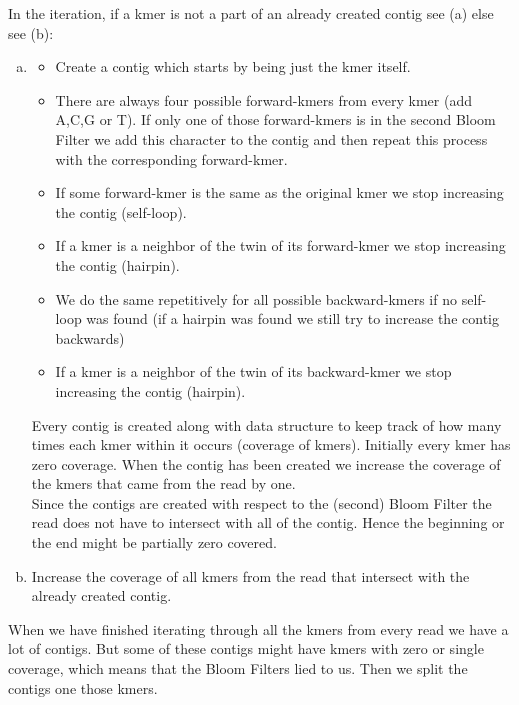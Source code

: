 \documentclass[a4paper]{report}
\begin{document}
In the iteration, if a kmer is not a part of an already created contig see (a) else see (b):

\begin{enumerate}[(a)]
\item
\begin{itemize} 
\item Create a contig which starts by being just the kmer itself.
\item There are always four possible forward-kmers from every kmer (add A,C,G or T). If only one of those 
forward-kmers is in the second Bloom Filter we add this character to the contig and then repeat this process
with the corresponding forward-kmer.
\item If some forward-kmer is the same as the original kmer we stop increasing the contig (self-loop).
\item If a kmer is a neighbor of the twin of its forward-kmer we stop increasing the contig (hairpin).
\item We do the same repetitively for all possible backward-kmers if no self-loop was found (if a hairpin was found
we still try to increase the contig backwards)
\item If a kmer is a neighbor of the twin of its backward-kmer we stop increasing the contig (hairpin).
\end{itemize}

Every contig is created along with data structure to keep track of how many times each kmer within it occurs (coverage of kmers).
Initially every kmer has zero coverage. 
When the contig has been created we increase the coverage of the kmers that came from the read by one.\\[4pt]

Since the contigs are created with respect to the (second) Bloom Filter the read does not have to intersect with all of the contig. Hence
the beginning or the end might be partially zero covered.\\[4pt]
\item Increase the coverage of all kmers from the read that intersect with the already created contig.
\end{enumerate}


When we have finished iterating through all the kmers from every read we have a lot of contigs. But some of these contigs might have 
kmers with zero or single coverage, which means that the Bloom Filters lied to us. Then we split the contigs one those kmers.\\[4pt]
\end{document}
